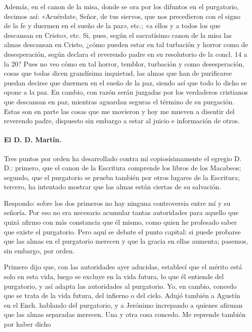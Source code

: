 Además, en el canon de la misa, donde se ora por los difuntos en el purgatorio, decimos así: «Acuérdate, Señor, de tus siervos, que nos precedieron con el signo de la fe y duermen en el sueño de la paz», etc.; «a ellos y a todos los que descansan en Cristo», etc. Si, pues, según el sacratísimo canon de la misa las almas descansan en Cristo, ¿cómo pueden estar en tal turbación y horror como de desesperación, según declara el reverendo padre en su resolutorio de la concl. 14 a la 20? Pues no veo cómo en tal horror, temblor, turbación y como desesperación, cosas que todas dicen grandísima inquietud, las almas que han de purificarse puedan decirse que duermen en el sueño de la paz, siendo así que todo lo dicho se opone a la paz. En cambio, con razón serán juzgadas por los verdaderos cristianos que descansan en paz, mientras aguardan seguras el término de su purgación. Estas son en parte las cosas que me movieron y hoy me mueven a disentir del reverendo padre, dispuesto sin embargo a estar al juicio e información de otros.

\paragraph*{El D. D. Martín.}

Tres puntos por orden ha desarrollado contra mí copiosísimamente el egregio D. D.: primero, que el canon de la Escritura comprende los libros de los Macabeos; segundo, que el purgatorio se prueba también por otros lugares de la Escritura; tercero, ha intentado mostrar que las almas están ciertas de su salvación.

Respondo: sobre los dos primeros no hay ninguna controversia entre mí y su señoría. Por eso no era necesario acumular tantas autoridades para aquello \marginpar{\small[329]} que quizá afirmo con más constancia que él mismo, como quien he profesado saber que existe el purgatorio. Pero aquí se debate el punto capital: si puede probarse que las almas en el purgatorio merecen y que la gracia en ellas aumenta; pasemos, sin embargo, por orden.

Primero dijo que, con las autoridades ayer aducidas, establecí que el mérito está solo en esta vida, luego se excluye en la vida futura, lo que él entiende del purgatorio, y así adapta las autoridades al purgatorio. Yo, en cambio, concedo que se trata de la vida futura, del infierno o del cielo. Adujó también a Agustín en el Ench. hablando del purgatorio, y a Jerónimo increpando a quienes afirman que las almas separadas merecen. Una y otra cosa concedo. Me reprende también por haber dicho

